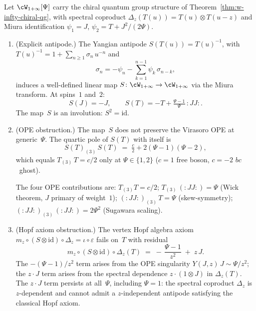 \begin{proposition}
\label{prop:w-infty-antipode-obstruction}
\ClaimStatusConditional
Let $\cW_{1+\infty}[\Psi]$ carry the chiral quantum group
structure of Theorem~\textup{\ref{thm:w-infty-chiral-qg}},
with spectral coproduct
$\Delta_z(T(u)) = T(u) \otimes T(u-z)$ and Miura
identification $\psi_1 = J$,
$\psi_2 = T + J^2/(2\Psi)$.
\begin{enumerate}[label=\textup{(\roman*)}]
\item \textup{(Explicit antipode.)}
The Yangian antipode $S(T(u)) = T(u)^{-1}$, with
$T(u)^{-1} = 1 + \sum_{n \geq 1} \sigma_n\, u^{-n}$
and
\begin{equation}\label{eq:transfer-inverse-recurrence}
 \sigma_n
 = -\psi_n
 - \sum_{k=1}^{n-1} \psi_k\, \sigma_{n-k},
\end{equation}
induces a well-defined linear map
$S \colon \cW_{1+\infty} \to \cW_{1+\infty}$
via the Miura transform. At spins~$1$ and~$2$:
\begin{equation}\label{eq:w-infty-antipode-explicit}
 S(J) = -J,
 \qquad
 S(T) = -T
 + \tfrac{\Psi - 1}{\Psi}\,{:}JJ{:}.
\end{equation}
The map~$S$ is an involution: $S^2 = \mathrm{id}$.

\item \textup{(OPE obstruction.)}
The map~$S$ does not preserve the Virasoro OPE at generic~$\Psi$.
The quartic pole of $S(T)$ with itself is
\begin{equation}\label{eq:antipode-quartic-obstruction}
 S(T)_{(3)}\, S(T)
 \;=\;
 \tfrac{c}{2}
 + 2(\Psi - 1)(\Psi - 2),
\end{equation}
which equals $T_{(3)}\, T = c/2$ only at
$\Psi \in \{1, 2\}$
\textup{(}$c = 1$ free boson, $c = -2$ $bc$~ghost\textup{)}.

The four OPE contributions are:
$T_{(3)}T = c/2$\textup{;}
$T_{(3)}\,({:}JJ{:}) = \Psi$
\textup{(}Wick theorem, $J$ primary of weight~$1$\textup{);}
$({:}JJ{:})_{(3)}\, T = \Psi$
\textup{(}skew-symmetry\textup{);}
$({:}JJ{:})_{(3)}\,({:}JJ{:}) = 2\Psi^2$
\textup{(}Sugawara scaling\textup{)}.

\item \textup{(Hopf axiom obstruction.)}
The vertex Hopf algebra axiom
$m_z \circ (S \otimes \mathrm{id}) \circ \Delta_z
= \iota \circ \varepsilon$
fails on~$T$ with residual
\begin{equation}\label{eq:antipode-hopf-obstruction}
 m_z \circ (S \otimes \mathrm{id})
 \circ \Delta_z(T)
 \;=\;
 -\,\frac{\Psi - 1}{z^2}
 \;+\; z\, J.
\end{equation}
The $-(\Psi - 1)/z^2$ term arises from the
OPE singularity $Y(J, z)\, J \sim \Psi/z^2$;
the $z \cdot J$ term arises from the
spectral dependence $z \cdot (1 \otimes J)$ in
$\Delta_z(T)$.
The $z \cdot J$ term persists at all~$\Psi$, including
$\Psi = 1$: the spectral coproduct $\Delta_z$ is
$z$-dependent and cannot admit a $z$-independent
antipode satisfying the classical Hopf axiom.
\end{enumerate}
\end{proposition}


